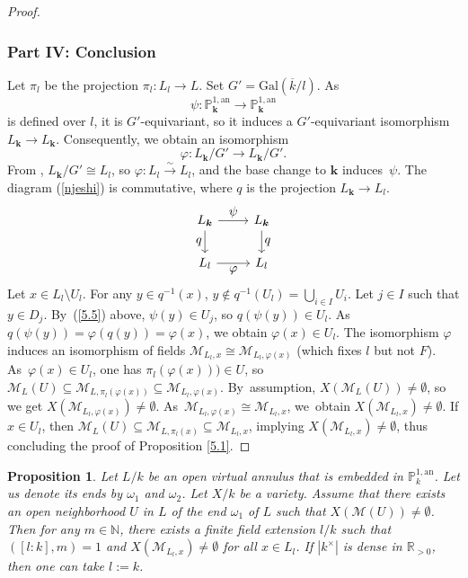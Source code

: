 \documentclass[10pt]{amsart}
\newcommand{\bbk}{{\boldsymbol{k}}}%
\let\backslash\setminus
\let\ts\textstyle
\newtheorem{prop}[thm]{Proposition}
\theoremstyle{definition}
\begin{document}
\begin{proof}
\subsubsection*{Part IV: Conclusion}
Let $\pi_l$ be the projection $\pi_l: L_l \to L$. Set $G'=\mathrm{Gal}(\overline{k}/l)$. As
\[
\psi: \mathbb{P}^{1, \mathrm{an}}_{\bbk} \to \mathbb{P}^{1, \mathrm{an}}_{\bbk}
\]
is defined over $l$, it is $G'$-equivariant, so it induces a $G'$-equivariant isomorphism $L_{\bbk} \to L_{\bbk}$. Consequently, we obtain an isomorphism
\[
\varphi: L_{\bbk}/G' \to L_{\bbk}/G'.
\]
From \cite[Cor.\,1.3.6]{Ber90}, $L_{\bbk}/G' \cong L_l$, so $\varphi: L_l \xrightarrow{\sim} L_l$, and the base change to $\bbk$ induces~$\psi$. The diagram (\ref{njeshi}) is commutative, where $q$ is the projection $L_{\bbk} \to L_l$.
\begin{equation} \label{njeshi}
\begin{tikzcd}
L_{\bbk} \arrow{r}{\ts\psi} \arrow{d}[swap]{\ts q}& L_{\bbk} \arrow{d}{\ts q} \\
L_l \arrow{r}[swap]{\ts\varphi} & L_l
\end{tikzcd}
\end{equation}
Let $x \in L_l \backslash U_l$. For any $y \in q^{-1}(x)$, $y \not \in q^{-1}(U_l)=\bigcup_{i \in I} U_i$. Let $j \in I$ such that $y \in D_j$. By~(\ref{5.5}) above, $\psi(y) \in U_j$, so $q(\psi(y)) \in U_l$. As~$q(\psi(y))=\varphi(q(y))=\varphi(x)$, we obtain $\varphi(x) \in U_l$. The isomorphism $\varphi$ induces an isomorphism of fields $\mathscr{M}_{L_l, x} \cong \mathscr{M}_{L_l, \varphi(x)}$ (which fixes $l$ but not $F$). As~$\varphi(x) \in U_l$, one has $\pi_l(\varphi(x))) \in U$, so $\mathscr{M}_L(U) \subseteq \mathscr{M}_{L, \pi_l(\varphi(x))} \subseteq \mathscr{M}_{L_l, \varphi(x)}$. By~assumption, $X(\mathscr{M}_L(U)) \neq \emptyset$, so we get $X(\mathscr{M}_{L_l, \varphi(x)}) \neq \emptyset$. As~$\mathscr{M}_{L_l, \varphi(x)} \cong \mathscr{M}_{L_l,x}$, we~obtain $X(\mathscr{M}_{L_l, x}) \neq \emptyset$.
If $x \in U_l$, then $\mathscr{M}_{L}(U) \subseteq \mathscr{M}_{L, \pi_l(x)} \subseteq \mathscr{M}_{L_l, x}$, implying $X(\mathscr{M}_{L_l, x}) \neq \emptyset$, thus concluding the proof of Proposition \ref{5.1}.
\end{proof}

\begin{prop} \label{5.5.1}
Let $L/k$ be an open virtual annulus that is embedded in $\mathbb{P}_k^{1, \mathrm{an}}$. Let us denote its ends by $\omega_1$ and $\omega_2$. Let $X/k$ be a variety. Assume that there exists an open neighborhood $U$ in $L$ of the end $\omega_1$ of $L$ such that $X(\mathscr{M}(U)) \neq \emptyset$. Then for any $m \in \mathbb{N}$, there exists a finite field extension $l/k$ such that $([l:k], m)=1$ and $X(\mathscr{M}_{L_l, x}) \neq \emptyset$ for all $x \in L_l$.
If $|k^{\times}|$ is dense in $\mathbb{R}_{>0}$, then one can take $l:=k$.
\end{prop}
\end{document}
